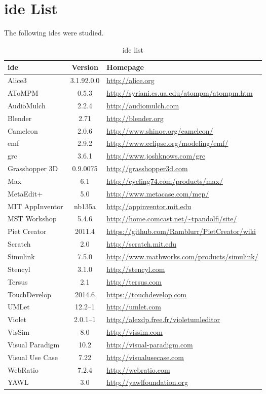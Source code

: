 \section{\acs{ide} List}
\label{sec:ide_list}

The following \acp{ide} were studied.

\noindent
\begin{table}[!htb]\centering
{}
\label{table:ides}
\begin{tabularx}{\textwidth}{@{}lcX@{}}\toprule
  \textbf{\ac{ide}} & \textbf{Version} & \textbf{Homepage} \\
  \midrule
  Alice3 & 3.1.92.0.0 & \url{http://alice.org} \\
  AToMPM & 0.5.3 & \url{http://syriani.cs.ua.edu/atompm/atompm.htm} \\
  AudioMulch & 2.2.4 & \url{http://audiomulch.com} \\
  Blender & 2.71 & \url{http://blender.org} \\
  Cameleon & 2.0.6 & \url{http://www.shinoe.org/cameleon/} \\
  \ac{emf} & 2.9.2 & \url{http://www.eclipse.org/modeling/emf/} \\
  \ac{grc} & 3.6.1 & \url{http://www.joshknows.com/grc} \\
  Grasshopper 3D & 0.9.0075 & \url{http://grasshopper3d.com} \\
  Max & 6.1 & \url{http://cycling74.com/products/max/} \\
  MetaEdit+ & 5.0 & \url{http://www.metacase.com/mep/} \\
  MIT AppInventor & nb135a & \url{http://appinventor.mit.edu} \\
  MST Workshop & 5.4.6 & \url{http://home.comcast.net/~tpandolfi/site/} \\
  Piet Creator & 2011.4 & \url{https://github.com/Ramblurr/PietCreator/wiki} \\
  Scratch & 2.0 & \url{http://scratch.mit.edu} \\
  Simulink & 7.5.0 & \url{http://www.mathworks.com/products/simulink/} \\
  Stencyl & 3.1.0 & \url{http://stencyl.com} \\
  Tersus & 2.1 & \url{http://tersus.com} \\
  TouchDevelop & 2014.6 & \url{https://touchdevelop.com} \\
  UMLet & 12.2--1 & \url{http://umlet.com} \\
  Violet & 2.0.1--1 & \url{http://alexdp.free.fr/violetumleditor} \\
  VisSim & 8.0 & \url{http://vissim.com} \\
  Visual Paradigm & 10.2 & \url{http://visual-paradigm.com} \\
  Visual Use Case & 7.22 & \url{http://visualusecase.com} \\
  WebRatio & 7.2.4 & \url{http://webratio.com} \\
  YAWL & 3.0 & \url{http://yawlfoundation.org} \\
  \bottomrule
\end{tabularx}
\caption{\ac{ide} list}
\end{table}
